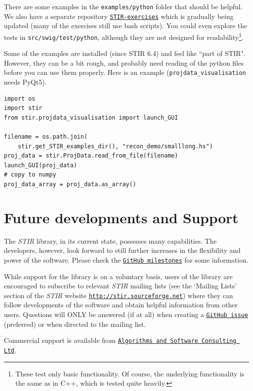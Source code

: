 \documentclass{article}
\def\url#1#2{\mbox{\href{#1}{\tt #2}}}
\begin{document}
{{{{{{  There are some examples in the \texttt{examples/python} folder that should be helpful.
  We also have a separate repository \url{https://github.com/UCL/STIR-exercises}{STIR-exercises}
  which is gradually being updated (many of the exercises still use bash scripts).
  You could even explore the tests in \texttt{src/swig/test/python}, although they are not
  designed for readability\footnote{These test only basic functionality.  Of course, the underlying
  functionality is the same as in C++, which is tested quite heavily.}.

  Some of the examples are installed (since STIR 6.4) and feel like ``part of STIR". However,
  they can be a bit rough, and probably need reading of the python files before you can use them properly.
  Here is an example (\texttt{projdata\_visualisation} needs PyQt5).
  \begin{verbatim}
import os
import stir
from stir.projdata_visualisation import launch_GUI

filename = os.path.join(
    stir.get_STIR_examples_dir(), "recon_demo/smalllong.hs")
proj_data = stir.ProjData.read_from_file(filename)    
launch_GUI(proj_data)
# copy to numpy
proj_data_array = proj_data.as_array()
  \end{verbatim}

\section{
Future developments and Support}

The \textit{STIR} library, in its current state, possesses many capabilities. 
The developers, however, look forward to still further increases 
in the flexibility and power of the software.
Please check the \url{https://github.com/UCL/STIR/milestones}{GitHub milestones}
for some information.


While support for the library is on a voluntary basis, users 
of the library are encouraged to subscribe to relevant \textit{STIR} 
mailing lists (see the `Mailing Lists' section of the \textit{STIR} website 
\url{http://stir.sourceforge.net/ }{http://stir.sourceforge.net}) 
where they can follow developments of the software and obtain 
helpful information from other users. Questions will ONLY be 
answered (if at all) when creating a \url{https://github.com/UCL/STIR/issues}{GitHub issue} (preferred) or
when directed to the mailing list.

Commercial support is available from \url{http://asc.uk.com}{Algorithms and
Software Consulting Ltd}.




}}}}}}
\end{document}
